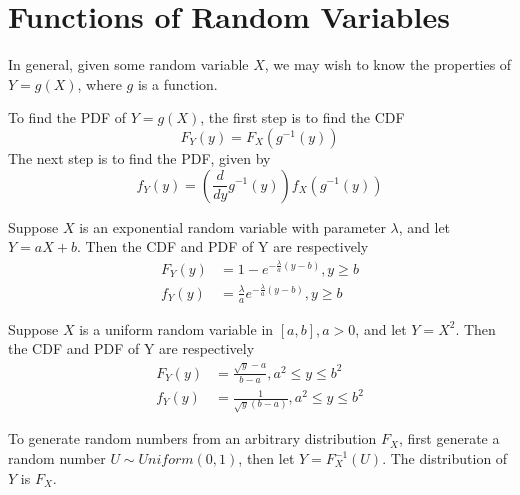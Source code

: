 \section{Functions of Random Variables}

In general, given some random variable
$X$, we may wish to know the properties
of $Y = g(X)$, where $g$ is a function.

To find the PDF of $Y = g(X)$, the first
step is to find the CDF
\begin{equation}
    F_Y(y) = F_X(g^{-1}(y))
\end{equation}
The next step is to find the PDF, given by
\begin{equation}
    f_Y(y) = \left(\frac{d}{dy}g^{-1}(y)\right)f_X(g^{-1}(y))
\end{equation}

Suppose $X$ is an exponential random variable
with parameter $\lambda$, and let $Y  = aX + b$.
Then the CDF and PDF of Y are respectively
\begin{align}
    F_Y(y) & = 1 - e^{-\frac{\lambda}{a}(y - b)}, y \geq b              \\
    f_Y(y) & = \frac{\lambda}{a}e^{-\frac{\lambda}{a}(y - b)}, y \geq b
\end{align}

Suppose $X$ is a uniform random variable in $\left[a, b\right], a > 0$,
and let $Y = X^2$. Then the CDF and PDF of Y are respectively
\begin{align}
    F_Y(y) & = \frac{\sqrt{y} - a}{b - a}, a^2 \leq y \leq b^2 \\
    f_Y(y) & = \frac{1}{\sqrt{y}(b - a)}, a^2 \leq y \leq b^2
\end{align}

To generate random numbers from an arbitrary
distribution $F_X$, first generate a random
number $U \sim Uniform(0,1)$, then let
$Y = F^{-1}_X(U)$. The distribution of $Y$ is
$F_X$.